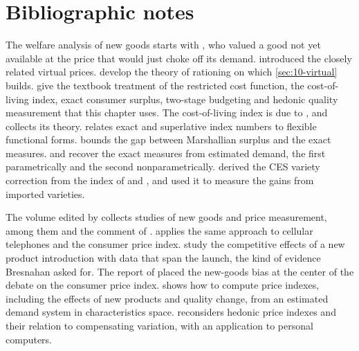 




\section{Bibliographic notes}\label{sec:10-bibnotes}

The welfare analysis of new goods starts with \citet{Hicks1940}, who valued a good not yet available at the price
that would just choke off its demand. \citet{Rothbarth1941} introduced the closely related virtual prices. \citet{NearyRoberts1980}
develop the theory of rationing on which \cref{sec:10-virtual} builds. \citet{DeatonMuellbauer1980b} give the
textbook treatment of the restricted cost function, the cost-of-living index, exact consumer surplus, two-stage
budgeting and hedonic quality measurement that this chapter uses. The cost-of-living index is due to
\citet{Konus1939}, and \citet{Pollak1989} collects its theory. \citet{Diewert1976} relates exact and superlative
index numbers to flexible functional forms. \citet{Willig1976} bounds the gap between Marshallian surplus and the
exact measures. \citet{Hausman1981} and \citet{HausmanNewey1995} recover the exact measures from estimated demand,
the first parametrically and the second nonparametrically. \citet{Feenstra1994} derived the CES variety correction
from the index of \citet{Sato1976} and \citet{Vartia1976}, and \citet{BrodaWeinstein2006} used it to measure the
gains from imported varieties.

The volume edited by \citet{BresnahanGordon1997} collects studies of new goods and price measurement, among them
\citet{Hausman1997} and the comment of \citet{Bresnahan1997}. \citet{Hausman1999} applies the same approach to
cellular telephones and the consumer price index. \citet{HausmanLeonard2002} study the competitive effects of a new
product introduction with data that span the launch, the kind of evidence Bresnahan asked for. The report of
\citet{BoskinEtAl1996} placed the new-goods bias at the center of the debate on the consumer price index.
\citet{Nevo2003} shows how to compute price indexes, including the effects of new products and quality change, from
an estimated demand system in characteristics space. \citet{Pakes2003} reconsiders hedonic price indexes and their
relation to compensating variation, with an application to personal computers.

